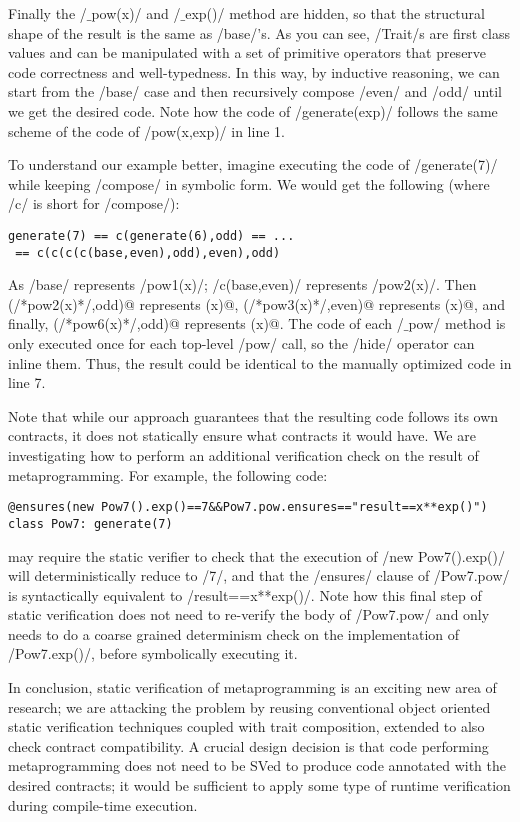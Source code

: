 Finally the /$\_$pow(x)/ and /$\_$exp()/ method are hidden, so that the structural shape of the result is
the same as /base/'s.
As you can see, /Trait/s are first class values and can be manipulated with a set of primitive operators that preserve code correctness and well-typedness.
In this way, by inductive reasoning, we can start from the /base/ case and then recursively compose /even/ and /odd/ until we get the desired code.
Note how the code of /generate(exp)/ follows the same scheme of the code of /pow(x,exp)/ in line 1.

To understand our example better, imagine executing the code of /generate(7)/ while keeping /compose/ in symbolic form. We would get the following (where /c/ is short for /compose/):
\vspace{-1ex}
\begin{lstlisting}[numbers=none]
generate(7) == c(generate(6),odd) == ...
 == c(c(c(c(base,even),odd),even),odd)
\end{lstlisting}
\vspace{-1ex}
As /base/ represents /pow1(x)/; /c(base,even)/ represents /pow2(x)/. Then \Q@c(/*pow2(x)*/,odd)@ represents (x)@, \Q@c(/*pow3(x)*/,even)@ represents (x)@, and finally,
\Q@c(/*pow6(x)*/,odd)@ represents (x)@.
The code of each /$\_$pow/ method is only executed once for each top-level /pow/ call, so the /hide/ operator can inline them.
Thus, the result could be identical to the manually optimized code in line 7.

Note that while our approach guarantees that the resulting code follows its own contracts, it does not statically ensure what contracts it would have.
We are investigating how
to perform an additional verification check
on the result of metaprogramming.
For example, the following code:
\vspace{-1ex}
\begin{lstlisting}[numbers=none]
@ensures(new Pow7().exp()==7&&Pow7.pow.ensures=="result==x**exp()")
class Pow7: generate(7)
\end{lstlisting}
\vspace{-1ex}
may require the static verifier to check that the execution of
/new Pow7().exp()/ will deterministically reduce to /7/, and that the /ensures/ clause of 
/Pow7.pow/ is syntactically equivalent to 
/result==x**exp()/. Note how this final step of static verification does not need to re-verify the body of
/Pow7.pow/ and only needs to do a coarse grained 
determinism check on the implementation of /Pow7.exp()/, before symbolically executing it.

In conclusion, static verification of metaprogramming is an exciting new area of research; we are attacking the problem by reusing conventional
object oriented static verification techniques coupled with trait composition, extended to also check contract compatibility. A crucial design decision is that code performing metaprogramming does not need to be SVed to produce code annotated with the desired contracts; it would be sufficient to apply some type of runtime verification during compile-time execution.